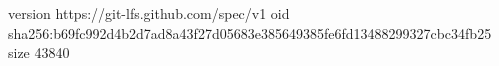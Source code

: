 version https://git-lfs.github.com/spec/v1
oid sha256:b69fc992d4b2d7ad8a43f27d05683e385649385fe6fd13488299327cbc34fb25
size 43840
